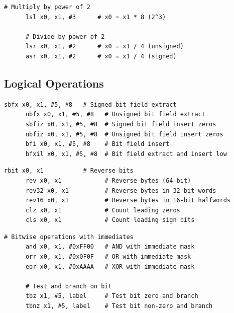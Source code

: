   \begin{definition}
    \label{def:power-of-2-operations}
    \begin{lstlisting}[language=arm]
      # Multiply by power of 2
      lsl x0, x1, #3      # x0 = x1 * 8 (2^3)
      
      # Divide by power of 2
      lsr x0, x1, #2      # x0 = x1 / 4 (unsigned)
      asr x0, x1, #2      # x0 = x1 / 4 (signed)
    \end{lstlisting}
  \end{definition}

\subsection{Logical Operations}

  \begin{definition}
    \label{def:bit-field-operations}
    \begin{lstlisting}[language=arm]
      sbfx x0, x1, #5, #8   # Signed bit field extract
      ubfx x0, x1, #5, #8   # Unsigned bit field extract  
      sbfiz x0, x1, #5, #8  # Signed bit field insert zeros
      ubfiz x0, x1, #5, #8  # Unsigned bit field insert zeros
      bfi x0, x1, #5, #8    # Bit field insert
      bfxil x0, x1, #5, #8  # Bit field extract and insert low
    \end{lstlisting}
  \end{definition}

  \begin{definition}
    \label{def:bit-manipulation}
    \begin{lstlisting}[language=arm]
      rbit x0, x1           # Reverse bits
      rev x0, x1            # Reverse bytes (64-bit)
      rev32 x0, x1          # Reverse bytes in 32-bit words
      rev16 x0, x1          # Reverse bytes in 16-bit halfwords
      clz x0, x1            # Count leading zeros
      cls x0, x1            # Count leading sign bits
    \end{lstlisting}
  \end{definition}

  \begin{definition}
    \label{def:advanced-logical-operations}
    \begin{lstlisting}[language=arm]
      # Bitwise operations with immediates
      and x0, x1, #0xFF00   # AND with immediate mask
      orr x0, x1, #0x0F0F   # OR with immediate mask
      eor x0, x1, #0xAAAA   # XOR with immediate mask
      
      # Test and branch on bit
      tbz x1, #5, label     # Test bit zero and branch
      tbnz x1, #5, label    # Test bit non-zero and branch
    \end{lstlisting}
  \end{definition}

